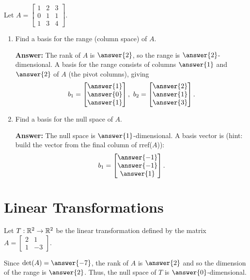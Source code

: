 \documentclass{ximera}
\begin{document}
\begin{example}
    Let $A = \begin{bmatrix} 1 & 2 & 3 \\ 0 & 1 & 1 \\ 1 & 3 & 4 \end{bmatrix}$.
    \begin{enumerate}
        \item Find a basis for the range (column space) of $A$.

        \textbf{Answer:} The rank of $A$ is $\answer{2}$, so the range is $\answer{2}$-dimensional. A basis for the range consists of columns $\answer{1}$ and $\answer{2}$ of $A$ (the pivot columns), giving
        \[
            b_1 = \begin{bmatrix} \answer{1} \\ \answer{0} \\ \answer{1} \end{bmatrix}, \quad
            b_2 = \begin{bmatrix} \answer{2} \\ \answer{1} \\ \answer{3} \end{bmatrix}.
        \]

        \item Find a basis for the null space of $A$.

        \textbf{Answer:} The null space is $\answer{1}$-dimensional. A basis vector is (hint: build the vector from the final column of rref($A$)):
        \[
            b_1 = \begin{bmatrix} \answer{-1} \\ \answer{-1} \\ \answer{1} \end{bmatrix}.
        \]

    \end{enumerate}
\end{example}

\section*{Linear Transformations}

\begin{example}
    Let $T:\mathbb{R}^2\to\mathbb{R}^2$ be the linear transformation defined by the matrix $A = \begin{bmatrix} 2 & 1 \\ 1 & -3 \end{bmatrix}$.

    Since $\det(A) = \answer{-7}$, the rank of $A$ is $\answer{2}$ and so the dimension of the range is $\answer{2}$. Thus, the null space of $T$ is $\answer{0}$-dimensional.
\end{example}
\end{document}

